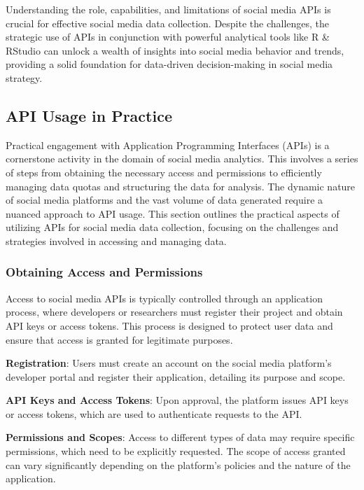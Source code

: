 \documentclass[
]{book}
\begin{document}
Understanding the role, capabilities, and limitations of social media APIs is crucial for effective social media data collection. Despite the challenges, the strategic use of APIs in conjunction with powerful analytical tools like R \& RStudio can unlock a wealth of insights into social media behavior and trends, providing a solid foundation for data-driven decision-making in social media strategy.

\hypertarget{api-usage-in-practice}{%
\subsection*{API Usage in Practice}\label{api-usage-in-practice}}

Practical engagement with Application Programming Interfaces (APIs) is a cornerstone activity in the domain of social media analytics. This involves a series of steps from obtaining the necessary access and permissions to efficiently managing data quotas and structuring the data for analysis. The dynamic nature of social media platforms and the vast volume of data generated require a nuanced approach to API usage. This section outlines the practical aspects of utilizing APIs for social media data collection, focusing on the challenges and strategies involved in accessing and managing data.

\hypertarget{obtaining-access-and-permissions}{%
\subsubsection*{Obtaining Access and Permissions}\label{obtaining-access-and-permissions}}

Access to social media APIs is typically controlled through an application process, where developers or researchers must register their project and obtain API keys or access tokens. This process is designed to protect user data and ensure that access is granted for legitimate purposes.

\textbf{Registration}: Users must create an account on the social media platform's developer portal and register their application, detailing its purpose and scope.

\textbf{API Keys and Access Tokens}: Upon approval, the platform issues API keys or access tokens, which are used to authenticate requests to the API.

\textbf{Permissions and Scopes}: Access to different types of data may require specific permissions, which need to be explicitly requested. The scope of access granted can vary significantly depending on the platform's policies and the nature of the application.
\end{document}
